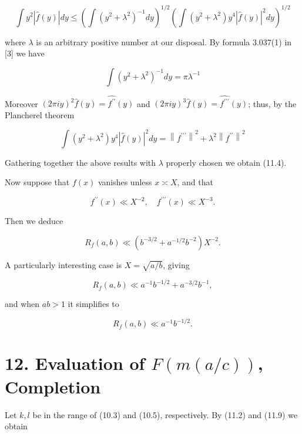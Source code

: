 \documentclass[10pt]{article}
\begin{document}
$$
\int y^{2}|\hat{f}(y)| d y \leqslant\left(\int\left(y^{2}+\lambda^{2}\right)^{-1} d y\right)^{1 / 2}\left(\int\left(y^{2}+\lambda^{2}\right) y^{4}|\hat{f}(y)|^{2} d y\right)^{1 / 2}
$$

where $\lambda$ is an arbitrary positive number at our disposal. By formula 3.037(1) in [3] we have

$$
\int\left(y^{2}+\lambda^{2}\right)^{-1} d y=\pi \lambda^{-1}
$$

Moreover $(2\pi iy)^{2}\widehat f(y)=\widehat{f^{\prime\prime}}(y)$ and $(2\pi iy)^{3}\widehat f(y)=\widehat{f^{\prime\prime\prime}}(y)$; thus, by the Plancherel theorem

$$
\int\left(y^{2}+\lambda^{2}\right) y^{4}|\hat{f}(y)|^{2} d y=\left\|f^{\prime \prime \prime}\right\|^{2}+\lambda^{2}\left\|f^{\prime \prime}\right\|^{2}
$$

Gathering together the above results with $\lambda$ properly chosen we obtain (11.4).

Now suppose that $f(x)$ vanishes unless $x\asymp X$, and that


\begin{equation*}
f^{\prime \prime}(x) \ll X^{-2}, \quad f^{\prime \prime \prime}(x) \ll X^{-3} . \tag{11.6}
\end{equation*}


Then we deduce


\begin{equation*}
R_{f}(a, b) \ll\left(b^{-3 / 2}+a^{-1 / 2} b^{-2}\right) X^{-2} . \tag{11.7}
\end{equation*}


A particularly interesting case is $X=\sqrt{a / b}$, giving


\begin{equation*}
R_{f}(a, b) \ll a^{-1} b^{-1 / 2}+a^{-3 / 2} b^{-1}, \tag{11.8}
\end{equation*}


and when $a b>1$ it simplifies to


\begin{equation*}
R_{f}(a, b) \ll a^{-1} b^{-1 / 2} . \tag{11.9}
\end{equation*}


\section*{12. Evaluation of $F(m(a / c))$, Completion}
Let $k, l$ be in the range of (10.3) and (10.5), respectively. By (11.2) and (11.9) we obtain
\end{document}
